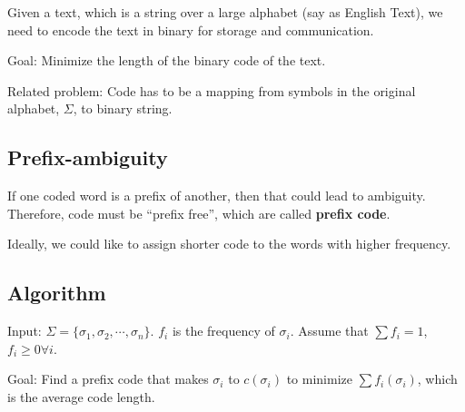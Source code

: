 Given a text, which is a string over a large alphabet (say as English Text), we need to encode the text in binary for storage and communication.

Goal: Minimize the length of the binary code of the text.

Related problem: Code has to be a mapping from symbols in the original alphabet, $\Sigma$, to binary string.

\subsection{Prefix-ambiguity}
If one coded word is a prefix of another, then that could lead to ambiguity. Therefore, code must be ``prefix free'', which are called \textbf{prefix code}.

Ideally, we could like to assign shorter code to the words with higher frequency.
\subsection{Algorithm}
Input: $\Sigma = \{\sigma_1, \sigma_2, \cdots, \sigma_n\}$. $f_i$ is the frequency of $\sigma_i$. Assume that $\sum f_i = 1$, $f_i \ge 0 \forall i$.

Goal: Find a prefix code that makes $\sigma_i$ to $c(\sigma_i)$ to minimize $\sum f_i(\sigma_i)$, which is the average code length.